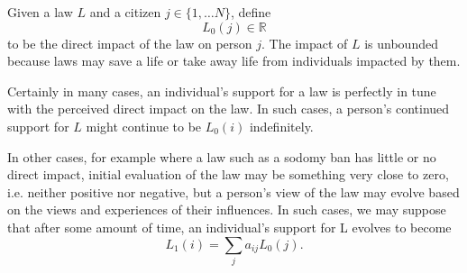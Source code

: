 Given a law $L$ and a citizen $j\in\{1,\dots N\}$, %
define $$L_0(j)\in\mathbb{R}$$ to be the direct impact of the law on person $j$. The impact of $L$ is unbounded because laws may save a life or take away life from individuals impacted by them.

Certainly in many cases, an individual's support for a law is perfectly in tune with the perceived direct impact on the law.  In such cases, a person's continued support for $L$ might continue to be $L_0(i)$ indefinitely. %

In other cases, for example where a law such as a sodomy ban has little or no direct impact, initial evaluation of the law may be something very close to zero, i.e. neither positive nor negative, but a person's view of the law may evolve based on the views and experiences of their influences.  In such cases, we may suppose that after some amount of time, an individual's support for L evolves to become $$L_1(i)=\sum_ja_{ij}L_0(j).$$



